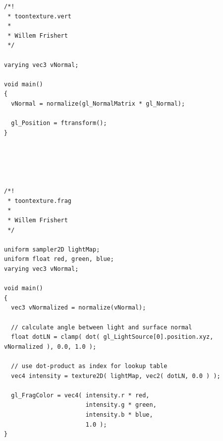 \documentclass[a4paper,12pt]{article}
\newenvironment{mylisting}
{\begin{list}{}{\setlength{\leftmargin}{1em}}\item\scriptsize\bfseries}
{\end{list}}
\begin{document}
\begin{mylisting}
	\begin{verbatim}
/*!
 * toontexture.vert
 * 
 * Willem Frishert
 */

varying vec3 vNormal;

void main()
{
  vNormal = normalize(gl_NormalMatrix * gl_Normal);
		
  gl_Position = ftransform();
}





/*!
 * toontexture.frag
 * 
 * Willem Frishert
 */

uniform sampler2D lightMap;
uniform float red, green, blue;
varying vec3 vNormal;

void main()
{
  vec3 vNormalized = normalize(vNormal);

  // calculate angle between light and surface normal
  float dotLN = clamp( dot( gl_LightSource[0].position.xyz, vNormalized ), 0.0, 1.0 );

  // use dot-product as index for lookup table
  vec4 intensity = texture2D( lightMap, vec2( dotLN, 0.0 ) );	

  gl_FragColor = vec4( intensity.r * red, 
                       intensity.g * green,
                       intensity.b * blue,
                       1.0 );
}
	\end{verbatim}
\end{mylisting}


\pagebreak[4]
\end{document}
